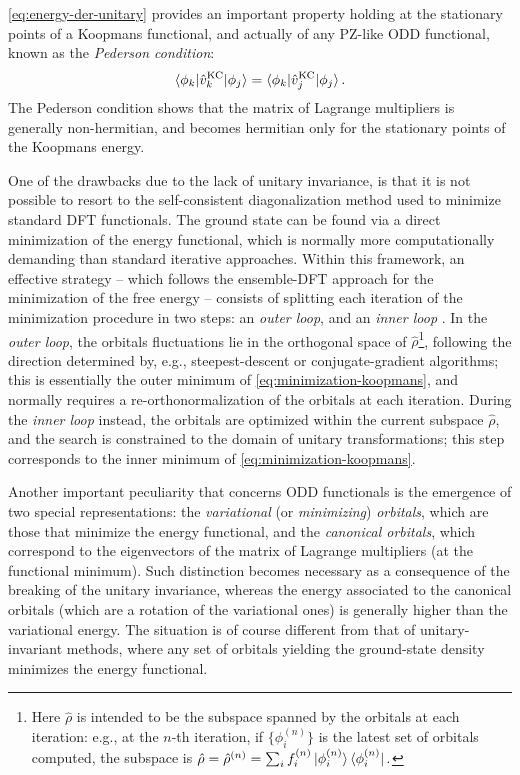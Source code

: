 %
\cref{eq:energy-der-unitary} provides an important property holding at the stationary points of a Koopmans functional, and actually of any PZ-like ODD functional, known as the \emph{Pederson condition}:
%
\begin{equation}
    \braket{\phi_k | \hat{v}^{\rm KC}_k | \phi_j} = \braket{\phi_k | \hat{v}^{\rm KC}_j | \phi_j} .
    \label{eq:pederson-condition}
\end{equation}
%
The Pederson condition shows that the matrix of Lagrange multipliers is generally non-hermitian, and becomes hermitian only for the stationary points of the Koopmans energy.

One of the drawbacks due to the lack of unitary invariance, is that it is not possible to resort to the self-consistent diagonalization method used to minimize standard DFT functionals. The ground state can be found via a direct minimization of the energy functional, which is normally more computationally demanding than standard iterative approaches. Within this framework, an effective strategy -- which follows the ensemble-DFT approach for the minimization of the free energy \cite{marzari_ensemble_1997} -- consists of splitting each iteration of the minimization procedure in two steps: an \emph{outer loop}, and an \emph{inner loop} \cite{borghi_variational_2015,stengel_self-interaction_2008,klupfel_optimization_2012}. In the \emph{outer loop}, the orbitals fluctuations lie in the orthogonal space of $\hat{\rho}$\footnote{Here $\hat{\rho}$ is intended to be the subspace spanned by the orbitals at each iteration: e.g., at the $n$-th iteration, if $\{ \phi_i^{(n)} \}$ is the latest set of orbitals computed, the subspace is $\hat{\rho} = \hat{\rho}^{(n)} = \sum_i f_i^{(n)} \ket{\phi_i^{(n)}}\bra{\phi_i^{(n)}}.$}, following the direction determined by, e.g., steepest-descent or conjugate-gradient algorithms; this is essentially the outer minimum of \cref{eq:minimization-koopmans}, and normally requires a re-orthonormalization of the orbitals at each iteration. During the \emph{inner loop} instead, the orbitals are optimized within the current subspace $\hat{\rho}$, and the search is constrained to the domain of unitary transformations; this step corresponds to the inner minimum of \cref{eq:minimization-koopmans}.

Another important peculiarity that concerns ODD functionals is the emergence of two special representations: the \emph{variational} (or \emph{minimizing}) \emph{orbitals}, which are those that minimize the energy functional, and the \emph{canonical orbitals}, which correspond to the eigenvectors of the matrix of Lagrange multipliers (at the functional minimum). Such distinction becomes necessary as a consequence of the breaking of the unitary invariance, whereas the energy associated to the canonical orbitals (which are a rotation of the variational ones) is generally higher than the variational energy. The situation is of course different from that of unitary-invariant methods, where any set of orbitals yielding the ground-state density minimizes the energy functional.

